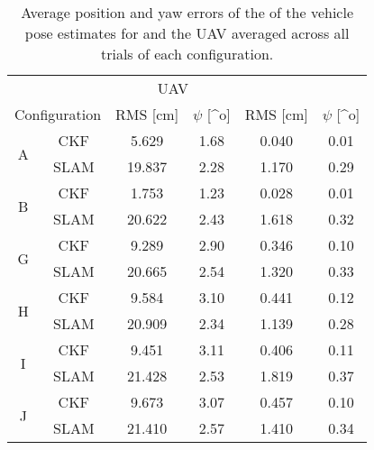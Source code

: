 \begin{table}
	\centering
	\caption{Average position and yaw errors of the of the vehicle pose estimates for  and the UAV averaged across all trials of each configuration.}
	\label{tab:RMSE}
	\renewcommand{\arraystretch}{1.25}
	\begin{tabular}{c c | c c | c c }
		\toprule
		\toprule
		& &\multicolumn{2}{c|}{UAV} & \multicolumn{2}{c}{\textsub{UGV}{1}}  \\ 
		\multicolumn{2}{c|}{Configuration} & RMS [cm] & $\psi$ [^o] & RMS [cm] & $\psi$ [^o]  \\ 
		\midrule
			\multirow{2}{*}{A}
				& CKF &  5.629 &   1.68&  0.040 &   0.01 \\
				& SLAM & 19.837 &   2.28&  1.170 &   0.29 \\
		\midrule
			\multirow{2}{*}{B}
				& CKF &  1.753 &   1.23&  0.028 &   0.01 \\
				& SLAM & 20.622 &   2.43&  1.618 &   0.32 \\
		\midrule
			\multirow{2}{*}{G}
				& CKF &  9.289 &   2.90&  0.346 &   0.10 \\
				& SLAM & 20.665 &   2.54&  1.320 &   0.33 \\
		\midrule
			\multirow{2}{*}{H}
				& CKF &  9.584 &   3.10&  0.441 &   0.12 \\
				& SLAM & 20.909 &   2.34&  1.139 &   0.28 \\
		\midrule
			\multirow{2}{*}{I}
				& CKF &  9.451 &   3.11&  0.406 &   0.11 \\
				& SLAM & 21.428 &   2.53&  1.819 &   0.37 \\
		\midrule
			\multirow{2}{*}{J}
				& CKF &  9.673 &   3.07&  0.457 &   0.10 \\
				& SLAM & 21.410 &   2.57&  1.410 &   0.34 \\
		\toprule
		\toprule
	\end{tabular}
	\renewcommand{\arraystretch}{1}
\end{table}
